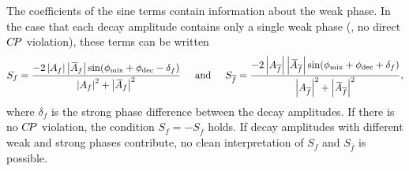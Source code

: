The coefficients of the sine terms
contain information about the weak phase. 
In the case that each decay amplitude contains only a single weak phase
(\ie, no direct $C\!P$ violation),
these terms can be written
\begin{equation}
  S_f = 
  \frac{ 
    - 2 \left| \Af \right| \left| \Abarf \right| 
    \sin( \phi_{\rm mix} + \phi_{\rm dec} - \delta_f )
  }{
    \left| \Af \right|^2 + \left| \Abarf \right|^2
  } 
  \hspace{5mm}
  {\rm and}
  \hspace{5mm}
  S_{\bar{f}} = 
  \frac{
    - 2 \left| \Afbar \right| \left| \Abarfbar \right| 
    \sin( \phi_{\rm mix} + \phi_{\rm dec} + \delta_f )
  }{
    \left| \Afbar \right|^2 + \left| \Abarfbar \right|^2
  },
\end{equation}
where $\delta_f$ is the strong phase difference between the decay amplitudes.
If there is no $C\!P$ violation, the condition $S_f = - S_{\bar{f}}$ holds.
If decay amplitudes with different weak and strong phases contribute,
no clean interpretation of $S_f$ and $S_{\bar{f}}$ is possible.

